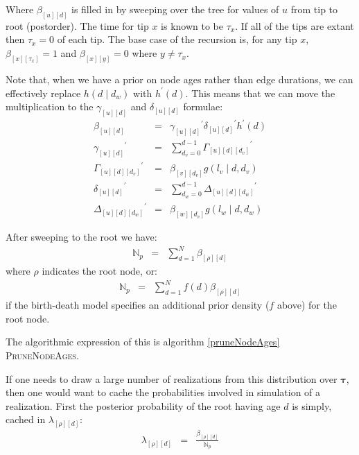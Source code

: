 \documentclass{llncs}
\newcommand{\edgeLen}[1]{\ensuremath{l_{#1}}\xspace}
\newcommand{\timeBinRealizationVec}[0]{\ensuremath{\bm{\tau}}\xspace}
\newcommand{\timeBinRealization}[1]{\ensuremath{\tau_{#1}}\xspace}
\newcommand{\subtreeAgeSum}[2]{\ensuremath{\beta_{[{#1}][{#2}]}}\xspace}
\newcommand{\leftThreeDTable}[3]{\ensuremath{\Gamma_{[{#1}][{#2}][{#3}]}}\xspace}
\newcommand{\rightThreeDTable}[3]{\ensuremath{\Delta_{[{#1}][{#2}][{#3}]}}\xspace}
\newcommand{\leftSubtreeAgeSum}[2]{\ensuremath{\gamma_{[{#1}][{#2}]}}\xspace}
\newcommand{\rightSubtreeAgeSum}[2]{\ensuremath{\delta_{[{#1}][{#2}]}}\xspace}
\newcommand{\ratePriorDensity}[0]{\ensuremath{g}\xspace}
\newcommand{\timePriorDensity}[0]{\ensuremath{h}\xspace}
\newcommand{\agePriorDensity}[0]{\ensuremath{h^{\prime}}\xspace}
\newcommand{\norm}[0]{\ensuremath{\mathbb{N}}\xspace}
\newcommand{\rootNode}[0]{\rho}
\newcommand{\rootPostProbCache}[2]{\ensuremath{\lambda_{[{#1}][{#2}]}}\xspace}
\begin{document}
Where $\subtreeAgeSum{u}{d}$ is filled in by sweeping over the tree for values of $u$ from tip to root (postorder).
The time for tip $x$ is known to be $\timeBinRealization{x}$. 
If all of the tips are extant then $\timeBinRealization{x}=0$ of each tip.
The base case of the recursion is, for any tip $x$, $\subtreeAgeSum{x}{\timeBinRealization{x}} = 1$ and $\subtreeAgeSum{x}{y} = 0$
where $y\neq\timeBinRealization{x}$.

Note that, when we have a prior on node ages rather than edge durations, we can effectively replace $\timePriorDensity(d\mid d_w)$ with $\agePriorDensity(d)$.
This means that we can move the multiplication to the $\leftSubtreeAgeSum{u}{d}$ and $\rightSubtreeAgeSum{u}{d}$ formulae:
\begin{eqnarray}
\subtreeAgeSum{u}{d} & = & \leftSubtreeAgeSum{u}{d}^{\prime} \rightSubtreeAgeSum{u}{d}^{\prime} \agePriorDensity(d) \\
\leftSubtreeAgeSum{u}{d}^{\prime} & = &  \sum_{d_v = 0}^{d-1} \leftThreeDTable{u}{d}{d_v}^{\prime} \\
\leftThreeDTable{u}{d}{d_v}^{\prime} & = & \subtreeAgeSum{v}{d_v} \ratePriorDensity(\edgeLen{v} \mid d, d_v)  \\
\rightSubtreeAgeSum{u}{d}^{\prime} & = & \sum_{d_w = 0}^{d-1} \rightThreeDTable{u}{d}{d_w}^{\prime} \\
\rightThreeDTable{u}{d}{d_w}^{\prime} & = & \subtreeAgeSum{w}{d_v} \ratePriorDensity(\edgeLen{w} \mid d, d_w)
\end{eqnarray}


After sweeping to the root we have:
\begin{eqnarray}
    \norm_p & = & \sum_{d = 1}^{N} \subtreeAgeSum{\rootNode}{d}
\end{eqnarray}
where $\rootNode$ indicates the root node, or:
\begin{eqnarray}
    \norm_p & = & \sum_{d = 1}^{N} f(d)\subtreeAgeSum{\rootNode}{d}
\end{eqnarray}
if the birth-death model specifies an additional prior density ($f$ above) for the root node.


The algorithmic expression of this is algorithm \ref{pruneNodeAges} \textsc{PruneNodeAges}.

If one needs to draw a large number of realizations from this distribution over $\timeBinRealizationVec$,
    then one would want to cache the probabilities involved in simulation of 
    a realization.
First the posterior probability of the root having age $d$ is simply, cached in $\rootPostProbCache{\rootNode}{d}$:
\begin{eqnarray}
    \rootPostProbCache{\rootNode}{d} & = & \frac{\subtreeAgeSum{\rootNode}{d}}{\norm_p} \label{rootProb}
\end{eqnarray}
\end{document}
